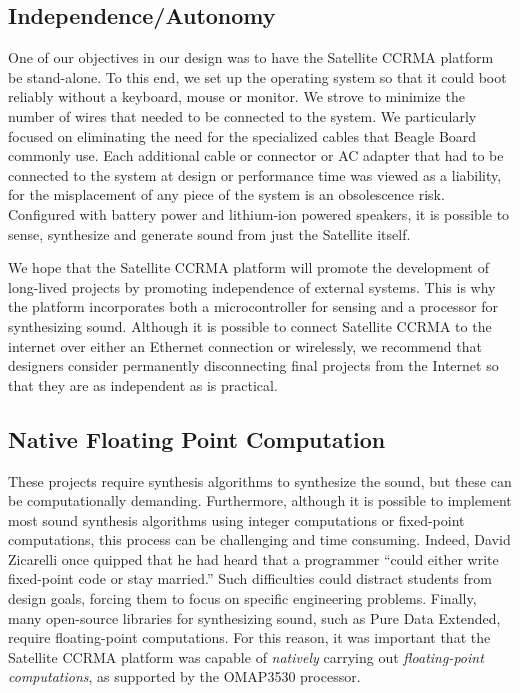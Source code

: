 \subsection{Independence/Autonomy}
One of our objectives in our design was to have the Satellite CCRMA platform be stand-alone. To this end, we set up the operating system so that it could boot reliably without a keyboard, mouse or monitor.  We strove to minimize the number of wires that needed to be connected to the system. We particularly focused on eliminating the need for the specialized cables that Beagle Board commonly use. Each additional cable or connector or AC adapter that had to be connected to the system at design or performance time was viewed as a liability, for the misplacement of any piece of the system is an obsolescence risk. Configured with battery power and lithium-ion powered speakers, it is possible to sense, synthesize and generate sound from just the Satellite itself.

We hope that the Satellite CCRMA platform will promote the development of long-lived projects by promoting independence of external systems.  This is why the platform incorporates both a microcontroller for sensing and a processor for synthesizing sound.  Although it is possible to connect Satellite CCRMA to the internet over either an Ethernet connection or wirelessly, we recommend that designers consider permanently disconnecting final projects from the Internet so that they are as independent as is practical.

\subsection{Native Floating Point Computation}

These projects require synthesis algorithms to synthesize the sound, but these can be computationally demanding.  Furthermore, although it is possible to implement most sound synthesis algorithms using integer computations or fixed-point computations, this process can be challenging and time consuming.  Indeed, David Zicarelli once quipped that he had heard that a programmer ``could either write fixed-point code or stay married.''  Such difficulties could distract students from design goals, forcing them to focus on specific engineering problems. Finally, many open-source libraries for synthesizing sound, such as Pure Data Extended, require floating-point computations.  For this reason, it was important that the Satellite CCRMA platform was capable of \emph{natively} carrying out \emph{floating-point computations}, as supported by the OMAP3530 processor.


